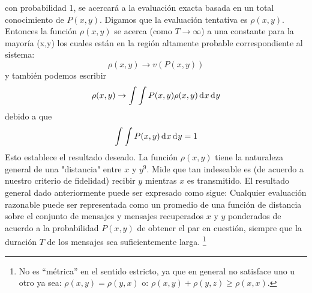 con probabilidad 1, se acercar\'a a la evaluaci\'on exacta basada en
un total conocimiento de $P(x, y)$. Digamos que la evaluaci\'on
tentativa es $\rho(x, y)$. Entonces la funci\'on $\rho(x, y)$ se
acerca (como $T \rightarrow \infty$) a una constante para la mayor\'ia
(x,y) los cuales est\'an en la regi\'on altamente probable
correspondiente al sistema:
\begin{equation} \rho(x, y) \rightarrow v(P(x, y)) \end{equation}
y tambi\'en podemos escribir
\begin{equation} \rho(x, y) \rightarrow \int \int P(x,y)\rho(x, y) \diff x  \diff y \end{equation}
debido a que
\begin{equation} \int \int P(x, y) \diff x  \diff y = 1 \end{equation}
Esto establece el resultado deseado. La funci\'on $\rho(x, y)$ tiene
la naturaleza general de una "distancia" entre $x$ y $y^{9}$. Mide
que tan indeseable es (de acuerdo a nuestro criterio de fidelidad)
recibir $y$ mientras $x$ es transmitido. El resultado general dado
anteriormente puede ser expresado como sigue: Cualquier evaluaci\'on
razonable puede ser representada como un promedio de una funci\'on de
distancia sobre el conjunto de mensajes y mensajes recuperados $x$ y
$y$ ponderados de acuerdo a la probabilidad $P(x, y)$ de obtener el
par en cuesti\'on, siempre que la duraci\'on $T$ de los mensajes sea
suficientemente larga. \footnote{No es ``m\'etrica'' en el sentido
 estricto, ya que en general no satisface uno u otro ya sea:
 $\rho(x,y) = \rho(y,x)$ o: $\rho(x,y) + \rho(y,z) \geq \rho(x,x)$.}

